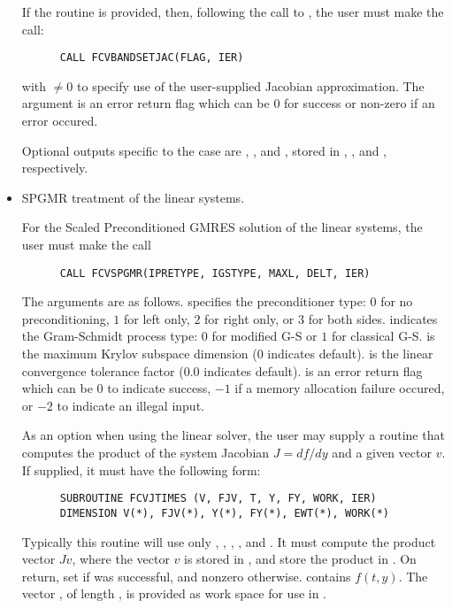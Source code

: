 \begin{Steps}
\begin{itemize}
    If the  routine is provided, then, following the call to ,
    the user must make the call:
\begin{verbatim}
      CALL FCVBANDSETJAC(FLAG, IER)
\end{verbatim}
    with $\neq 0$ to specify use of the user-supplied Jacobian approximation.
    The argument  is an error return flag which can be $0$ 
    for success or non-zero if an error occured.

    Optional outputs specific to the {\band} case are , , and ,
    stored in , , and , respectively.

  \item SPGMR treatment of the linear systems.

    For the Scaled Preconditioned GMRES solution of the linear systems,
    the user must make the call
\begin{verbatim}
      CALL FCVSPGMR(IPRETYPE, IGSTYPE, MAXL, DELT, IER)
\end{verbatim}
    The arguments are as follows.
     specifies the preconditioner type: 
       $0$ for no preconditioning, $1$ for left only, $2$ for right only, or $3$ for both sides.
     indicates the Gram-Schmidt process type: 
       $0$ for modified G-S or  $1$ for classical G-S.
     is the maximum Krylov subspace dimension ($0$ indicates default).
     is the linear convergence tolerance factor ($0.0$ indicates default).
     is an error return flag which can be $0$ to indicate success, 
       $-1$ if a memory allocation failure occured, or $-2$ to indicate an illegal input.
       
    As an option when using the {\spgmr} linear solver, the user may supply a 
    routine that computes the product of the system Jacobian $J = df/dy$ and 
    a given vector $v$.  If supplied, it must have the following form:
\begin{verbatim}
      SUBROUTINE FCVJTIMES (V, FJV, T, Y, FY, WORK, IER)
      DIMENSION V(*), FJV(*), Y(*), FY(*), EWT(*), WORK(*)
\end{verbatim}
    Typically this routine will use only , , , , and .
    It must compute the product vector $Jv$, where the vector $v$ is stored in , 
    and store the product in .  On return, set  if 
    was successful, and nonzero otherwise.
     contains $f(t,y)$. The vector , of length , is
    provided as work space for use in .


\end{itemize}
\end{Steps}
